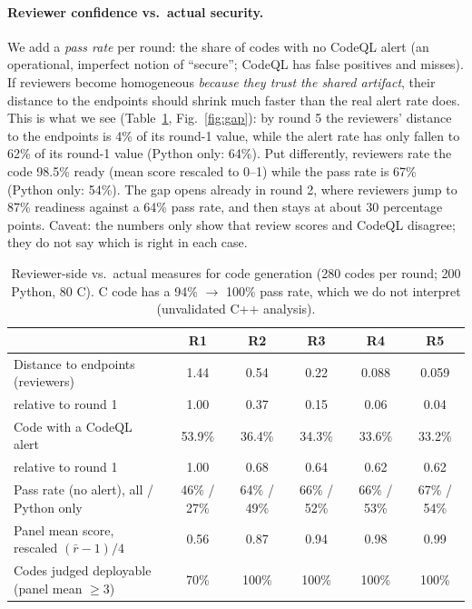 \documentclass[11pt]{article}
\begin{document}
\paragraph{Reviewer confidence vs.\ actual security.} We add a \emph{pass rate} per round: the share of codes with no CodeQL alert (an operational, imperfect notion of ``secure''; CodeQL has false positives and misses). If reviewers become homogeneous \emph{because they trust the shared artifact}, their distance to the endpoints should shrink much faster than the real alert rate does. This is what we see (Table~\ref{tab:gap}, Fig.~\ref{fig:gap}): by round 5 the reviewers' distance to the endpoints is 4\% of its round-1 value, while the alert rate has only fallen to 62\% of its round-1 value (Python only: 64\%). Put differently, reviewers rate the code 98.5\% ready (mean score rescaled to 0--1) while the pass rate is 67\% (Python only: 54\%). The gap opens already in round 2, where reviewers jump to 87\% readiness against a 64\% pass rate, and then stays at about 30 percentage points. Caveat: the numbers only show that review scores and CodeQL disagree; they do not say which is right in each case.

\begin{table}[H]\centering\small
\begin{tabular}{@{}lccccc@{}}
\toprule
 & R1 & R2 & R3 & R4 & R5\\\midrule
Distance to endpoints (reviewers) & 1.44 & 0.54 & 0.22 & 0.088 & 0.059\\
\quad relative to round 1 & 1.00 & 0.37 & 0.15 & 0.06 & 0.04\\
Code with a CodeQL alert & 53.9\% & 36.4\% & 34.3\% & 33.6\% & 33.2\%\\
\quad relative to round 1 & 1.00 & 0.68 & 0.64 & 0.62 & 0.62\\
Pass rate (no alert), all / Python only & 46\% / 27\% & 64\% / 49\% & 66\% / 52\% & 66\% / 53\% & 67\% / 54\%\\
Panel mean score, rescaled $(\bar r-1)/4$ & 0.56 & 0.87 & 0.94 & 0.98 & 0.99\\
Codes judged deployable (panel mean $\ge3$) & 70\% & 100\% & 100\% & 100\% & 100\%\\\bottomrule
\end{tabular}
\caption{Reviewer-side vs.\ actual measures for code generation (280 codes per round; 200 Python, 80 C). C code has a 94\% $\to$ 100\% pass rate, which we do not interpret (unvalidated C++ analysis).}\label{tab:gap}
\end{table}
\end{document}
